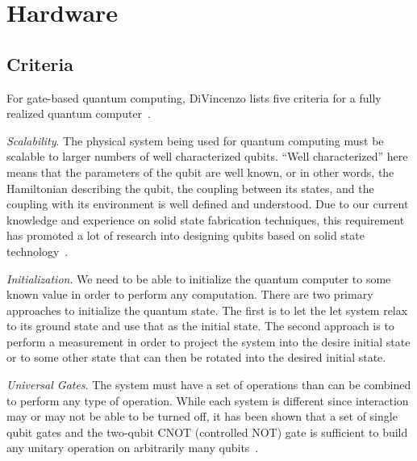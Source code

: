 \section{Hardware}\label{SEC:hardware}

\subsection{Criteria}
For gate-based quantum computing, DiVincenzo lists five criteria for a fully realized quantum computer~\cite{divincenzo_2000}.

\emph{Scalability}. The physical system being used for quantum computing must be scalable to larger numbers of well characterized qubits.
``Well characterized'' here means that the parameters of the qubit are well known, or in other words, the Hamiltonian describing the qubit, the coupling between its states, and the coupling with its environment is well defined and understood.
Due to our current knowledge and experience on solid state fabrication techniques, this requirement has promoted a lot of research into designing qubits based on solid state technology~\cite{loss_1998,imamoglu_1999,kane_1998}.

\emph{Initialization}. We need to be able to initialize the quantum computer to some known value in order to perform any computation.
There are two primary approaches to initialize the quantum state.
The first is to let the let system relax to its ground state and use that as the initial state.
The second approach is to perform a measurement in order to project the system into the desire initial state or to some other state that can then be rotated into the desired initial state.

\emph{Universal Gates}. The system must have a set of operations than can be combined to perform any type of operation.
While each system is different since interaction may or may not be able to be turned off, it has been shown that a set of single qubit gates and the two-qubit CNOT (controlled NOT) gate is sufficient to build any unitary operation on arbitrarily many qubits~\cite{barenco_1995}.

